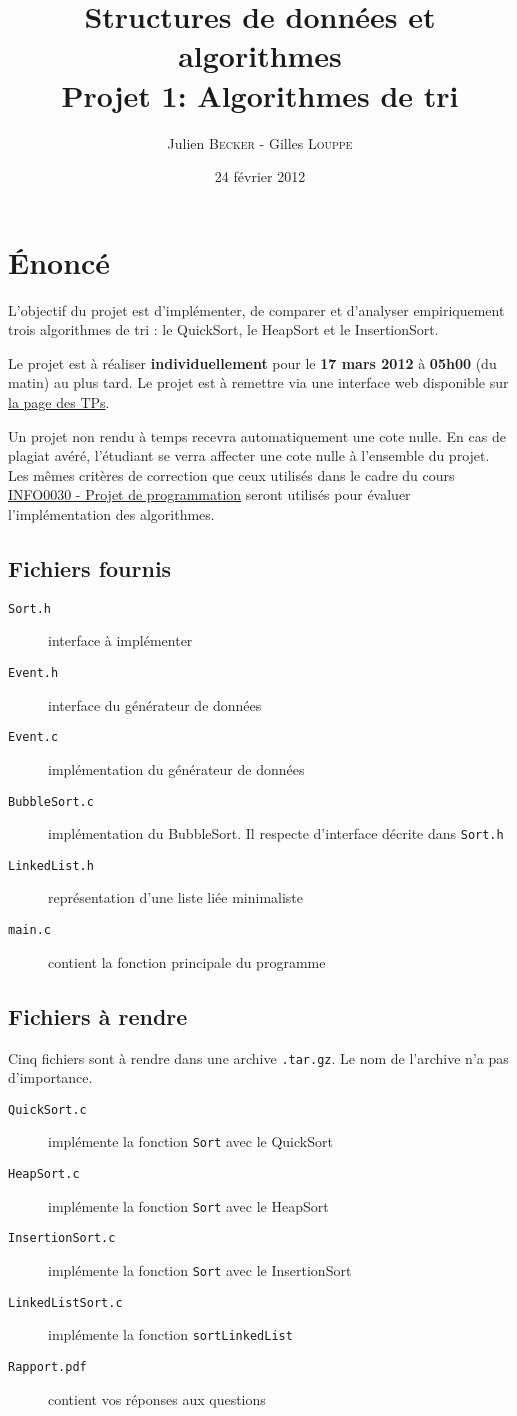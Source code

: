 \documentclass[a4paper,10pt]{article}
\title{
    \textbf{Structures de données et algorithmes}\\
    Projet 1: Algorithmes de tri
}
\author{Julien \textsc{Becker} - Gilles \textsc{Louppe}}
\date{24 février 2012}
\begin{document}
\maketitle

\section*{\'Enoncé}

L'objectif du projet est d'implémenter, de comparer et d'analyser empiriquement
trois algorithmes de tri : le QuickSort, le HeapSort et le InsertionSort.

Le projet est à réaliser {\bf individuellement} pour le {\bf 17 mars 2012} à
{\bf 05h00} (du matin) au plus tard. Le projet est à remettre via une interface
web disponible sur \href{http://www.montefiore.ulg.ac.be/~glouppe/2011-2012/students.info0902.php}{la page des TPs}.

Un projet non rendu à temps recevra automatiquement une cote nulle. En cas de
plagiat avéré, l'étudiant se verra affecter une cote nulle à l'ensemble du
projet. Les mêmes critères de correction que ceux utilisés dans le cadre du
cours \href{http://www.montefiore.ulg.ac.be/~info0030/}{INFO0030 - Projet de programmation}
seront utilisés pour évaluer l'implémentation des algorithmes.

\subsection*{Fichiers fournis}
\begin{description}
\item[\texttt{Sort.h}] interface à implémenter
\item[\texttt{Event.h}] interface du générateur de données
\item[\texttt{Event.c}] implémentation du générateur de données
\item[\texttt{BubbleSort.c}] implémentation du BubbleSort. Il respecte d'interface décrite dans \texttt{Sort.h}
\item[\texttt{LinkedList.h}] représentation d'une liste liée minimaliste
\item[\texttt{main.c}] contient la fonction principale du programme
\end{description}
\subsection*{Fichiers à rendre}
Cinq fichiers sont à rendre dans une archive \texttt{.tar.gz}. Le nom de l'archive n'a pas d'importance.
\begin{description}
\item[\texttt{QuickSort.c}] implémente la fonction \texttt{Sort} avec le QuickSort
\item[\texttt{HeapSort.c}] implémente la fonction \texttt{Sort} avec le HeapSort
\item[\texttt{InsertionSort.c}] implémente la fonction \texttt{Sort} avec le InsertionSort
\item[\texttt{LinkedListSort.c}] implémente la fonction \texttt{sortLinkedList}
\item[\texttt{Rapport.pdf}] contient vos réponses aux questions
\end{description}
\end{document}
